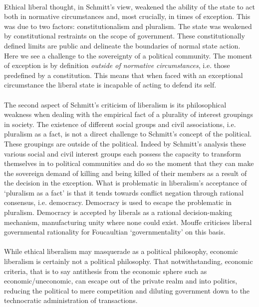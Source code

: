 \documentclass[12pt,a4paper,titlepage]{article}
\begin{document}
\paragraph{}Ethical liberal thought, in Schmitt's view, weakened the ability of the state to act both in normative circumstances and, most crucially, in times of exception. This was due to two factors: constitutionalism and pluralism. The state was weakened by constitutional restraints on the scope of government. These constitutionally defined limits are public and delineate the boundaries of normal state action. Here we see a challenge to the sovereignty of a political community. The moment of exception is by definition \emph{outside of normative circumstances}, i.e. those predefined by a constitution. This means that when faced with an exceptional circumstance the liberal state is incapable of acting to defend its self.

\paragraph{}The second aspect of Schmitt's criticism of liberalism is its philosophical weakness when dealing with the empirical fact of a plurality of interest groupings in society. The existence of different social groups and civil associations, i.e. pluralism as a fact, is not a direct challenge to Schmitt's concept of the political. These groupings are outside of the political. Indeed by Schmitt's analysis these various social and civil interest groups each possess the capacity to transform themselves in to political communities and do so the moment that they can make the sovereign demand of killing and being killed of their members as a result of the decision in the exception. What is problematic in liberalism's acceptance of `pluralism as a fact' is that it tends towards conflict negation through rational consensus, i.e. democracy. Democracy is used to escape the problematic in pluralism. Democracy is accepted by liberals as a rational decision-making mechanism, manufacturing unity where none could exist. Mouffe criticises liberal governmental rationality for Foucaultian `governmentality' on this basis.

\paragraph{}While ethical liberalism may masquerade as a political philosophy, economic liberalism is certainly not a political philosophy. That notwithstanding, economic criteria, that is to say antithesis from the economic sphere such as economic/uneconomic, can escape out of the private realm and into politics, reducing the political to mere competition and diluting government down to the technocratic administration of transactions.
\end{document}
